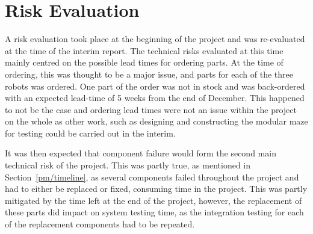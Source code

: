 \section{Risk Evaluation}\label{pm/riskeval}
A risk evaluation took place at the beginning of the project and
was re-evaluated at the time of the interim report. The technical
risks evaluated at this time mainly centred on the possible lead
times for ordering parts. At the time of ordering, this was
thought to be a major issue, and parts for each of the three
robots was ordered. One part of the order
was not in stock and was back-ordered with an expected
lead-time of 5 weeks from the end of December. This happened to
not be the case and ordering lead times were not an issue within
the project on the whole as other work, such as designing and
constructing the modular maze for testing could be carried out in
the interim.

It was then expected that component failure would form the second
main technical risk of the project. This was partly true, as
mentioned in Section~\ref{pm/timeline}, as several components
failed throughout the project and had to either be replaced or
fixed, consuming time in the project. This was partly mitigated by
the time left at the end of the project, however, the replacement
of these parts did impact on system testing time, as the
integration testing for each of the replacement components had to
be repeated.
